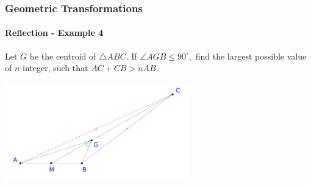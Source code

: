 \documentclass[8pt,xcolor=table,dvipsnames]{beamer}
\newcommand{\dg}{^\circ}
\begin{document}
\begin{frame}[t]
    \frametitle{Geometric Transformations}
    \framesubtitle{Reflection - Example 4}
    \begin{example}
        Let $G$ be the centroid of $\triangle ABC.$ If $\angle AGB \le 90\dg,$
        find the largest possible value of $n$ integer, such that $AC + CB > n AB.$
    \end{example}

    \bigbreak
    \begin{center}
        \includegraphics[width=8cm]{./svg/pdf/pct-2021-3-5-4-2-0.pdf}
    \end{center}
\end{frame}
\end{document}
